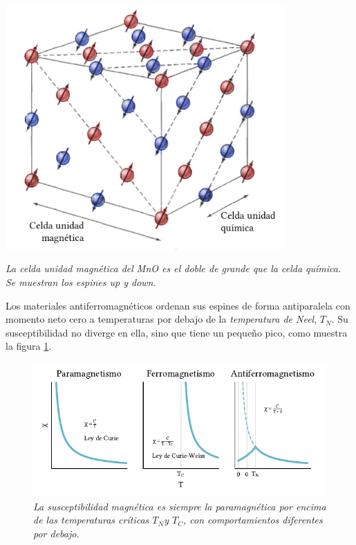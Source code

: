 \documentclass{tufte-book}
\newcommand{\sub}[1]{_{{\scriptscriptstyle\mathit{#1}}}}
\begin{document}
\begin{marginfigure}
  \centering
  \includegraphics[width=0.8\textwidth]{figures/mno.png}
  \caption{\itshape La celda unidad magnética del MnO es el doble de
    grande que la celda química. Se muestran los espines
    \textcolor{BrickRed}{up} y \textcolor{NavyBlue}{down}.}
  \label{fig:mno}
\end{marginfigure}

Los materiales antiferromagnéticos ordenan sus espines de forma
antiparalela con momento neto cero a temperaturas por debajo de la
\emph{temperatura de Neel}, $T\sub{N}$. Su susceptibilidad no diverge
en ella, sino que tiene un pequeño pico, como muestra la figura \ref{fig:susccompare}.

\begin{figure}
  \centering
  \includegraphics{figures/susccompare.pdf}
  \caption{ \itshape La susceptibilidad magnética es siempre la
    paramagnética por encima de las temperaturas críticas $T\sub{N}$y
    $T\sub{C}$, con comportamientos diferentes por debajo.}
  \label{fig:susccompare}
\end{figure}
\end{document}
